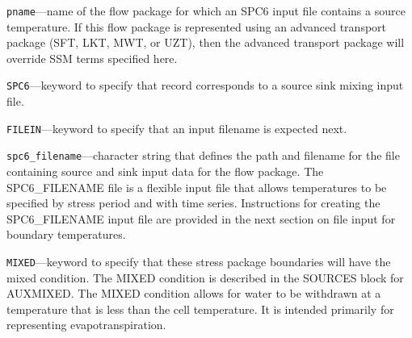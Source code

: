 \begin{description}
\item \texttt{pname}---name of the flow package for which an SPC6 input file contains a source temperature.  If this flow package is represented using an advanced transport package (SFT, LKT, MWT, or UZT), then the advanced transport package will override SSM terms specified here.

\item \texttt{SPC6}---keyword to specify that record corresponds to a source sink mixing input file.

\item \texttt{FILEIN}---keyword to specify that an input filename is expected next.

\item \texttt{spc6\_filename}---character string that defines the path and filename for the file containing source and sink input data for the flow package. The SPC6\_FILENAME file is a flexible input file that allows temperatures to be specified by stress period and with time series. Instructions for creating the SPC6\_FILENAME input file are provided in the next section on file input for boundary temperatures.

\item \texttt{MIXED}---keyword to specify that these stress package boundaries will have the mixed condition.  The MIXED condition is described in the SOURCES block for AUXMIXED.  The MIXED condition allows for water to be withdrawn at a temperature that is less than the cell temperature.  It is intended primarily for representing evapotranspiration.

\end{description}

